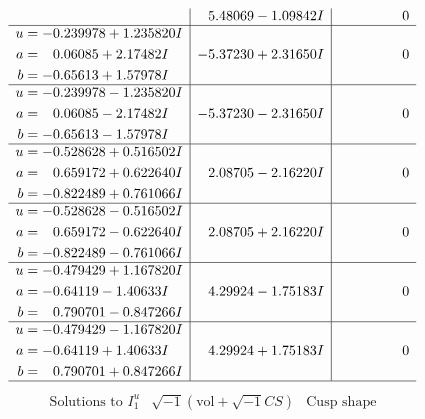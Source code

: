\documentclass[1p]{elsarticle_modified}
\theoremstyle{definition}
\newcommand{\I}{\sqrt{-1}}
\begin{document}
$$\begin{array}{c|c|c}
 & \phantom{-}5.48069 - 1.09842 I & \phantom{-0.000000 } 0 \\ \hline\begin{aligned}
u &= -0.239978 + 1.235820 I \\
a &= \phantom{-}0.06085 + 2.17482 I \\
b &= -0.65613 + 1.57978 I\end{aligned}
 & -5.37230 + 2.31650 I & \phantom{-0.000000 } 0 \\ \hline\begin{aligned}
u &= -0.239978 - 1.235820 I \\
a &= \phantom{-}0.06085 - 2.17482 I \\
b &= -0.65613 - 1.57978 I\end{aligned}
 & -5.37230 - 2.31650 I & \phantom{-0.000000 } 0 \\ \hline\begin{aligned}
u &= -0.528628 + 0.516502 I \\
a &= \phantom{-}0.659172 + 0.622640 I \\
b &= -0.822489 + 0.761066 I\end{aligned}
 & \phantom{-}2.08705 - 2.16220 I & \phantom{-0.000000 } 0 \\ \hline\begin{aligned}
u &= -0.528628 - 0.516502 I \\
a &= \phantom{-}0.659172 - 0.622640 I \\
b &= -0.822489 - 0.761066 I\end{aligned}
 & \phantom{-}2.08705 + 2.16220 I & \phantom{-0.000000 } 0 \\ \hline\begin{aligned}
u &= -0.479429 + 1.167820 I \\
a &= -0.64119 - 1.40633 I \\
b &= \phantom{-}0.790701 - 0.847266 I\end{aligned}
 & \phantom{-}4.29924 - 1.75183 I & \phantom{-0.000000 } 0 \\ \hline\begin{aligned}
u &= -0.479429 - 1.167820 I \\
a &= -0.64119 + 1.40633 I \\
b &= \phantom{-}0.790701 + 0.847266 I\end{aligned}
 & \phantom{-}4.29924 + 1.75183 I & \phantom{-0.000000 } 0\\
 \hline 
 \end{array}$$\newpage$$\begin{array}{c|c|c}  
\text{Solutions to }I^u_{1}& \I (\text{vol} + \sqrt{-1}CS) & \text{Cusp shape}\\

\end{array}$$
\end{document}
